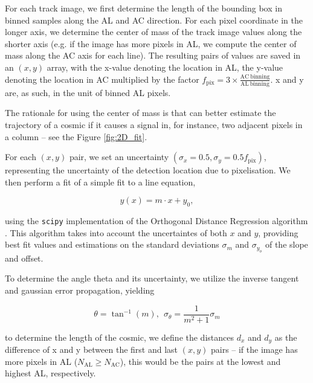 \documentclass[a4paper, 11pt]{article}
\begin{document}
For each track image, we first determine the length of the bounding box in binned samples along the AL and AC direction. For each pixel coordinate in the longer axis, we determine the center of mass of the track image values along the shorter axis (e.g. if the image has more pixels in AL, we compute the center of mass along the AC axis for each line). The resulting pairs of values are saved in an $(x,y)$ array, with the x-value denoting the location in AL, the y-value denoting the location in AC multiplied by the factor $f_\mathrm{pix} = 3\times \frac{\mathrm{AC~binning}}{\mathrm{AL~binning}}$. x and y are, as such, in the unit of binned AL pixels.

The rationale for using the center of mass is that can better estimate the trajectory of a cosmic if it causes a signal in, for instance, two adjacent pixels in a column -- see the Figure \ref{fig:2D_fit}. 

For each $(x,y)$ pair, we set an uncertainty $(\sigma_x = 0.5, \sigma_y = 0.5 f_\mathrm{pix})$, representing the uncertainty of the detection location due to pixelisation. We then perform a fit of a simple fit to a line equation,

\begin{equation}
  y(x) = m \cdot x + y_0,
\end{equation}

using the \texttt{scipy} implementation of the Orthogonal Distance Regression algorithm \cite{ODR}. This algorithm takes into account the uncertaintes of both $x$ and $y$, providing best fit values and estimations on the standard deviations $\sigma_m$ and $\sigma_{y_o}$ of the slope and offset.

To determine the angle theta and its uncertainty, we utilize the inverse tangent and gaussian error propagation, yielding

\begin{equation}
  \theta = \tan^{-1}\left( m \right), ~~ \sigma_\theta = \frac{1}{m^{2}+1} \sigma_m
\end{equation}

to determine the length of the cosmic, we define the distances $d_x$ and $d_y$ as the difference of x and y between the first and last $(x,y)$ pairs -- if the image has more pixels in AL ($N_\mathrm{AL} \geq N_\mathrm{AC}$), this would be the pairs at the lowest and highest AL, respectively.
\end{document}
